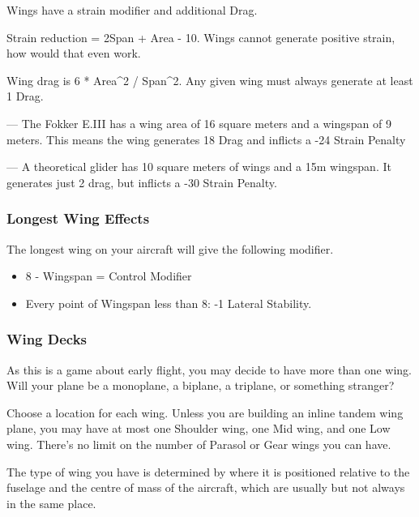 \documentclass{article}
\begin{document}
Wings have a strain modifier and additional Drag.

Strain reduction = 2Span + Area - 10. Wings cannot generate positive
strain, how would that even work.

Wing drag is 6 * Area\^{}2 / Span\^{}2. Any given wing must always
generate at least 1 Drag.

--- The Fokker E.III has a wing area of 16 square
meters and a wingspan of 9 meters. This means the wing generates
18 Drag and inflicts a -24 Strain Penalty

--- A theoretical glider has 10 square meters of wings and a
15m wingspan. It generates just 2 drag,
but inflicts a -30 Strain Penalty.

\subsubsection{Longest Wing Effects}
\label{_Longest Wing Effects}

The longest wing on your aircraft will give the following modifier.

\begin{itemize}
    \item          8 - Wingspan = Control Modifier
    \item          Every point of Wingspan less than 8: -1 Lateral Stability.
\end{itemize}

\subsubsection{Wing Decks}
\label{_Wing Decks}

As this is a game about early flight, you may decide to have more than
one wing. Will your plane be a monoplane, a biplane, a triplane, or
something stranger?

Choose a location for each wing. Unless you are building an inline
tandem wing plane, you may have at most one Shoulder wing, one Mid wing,
and one Low wing. There's no limit on the number of Parasol or Gear
wings you can have.

The type of wing you have is determined by where it is positioned
relative to the fuselage and the centre of mass of the aircraft, which
are usually but not always in the same place.
\end{document}
